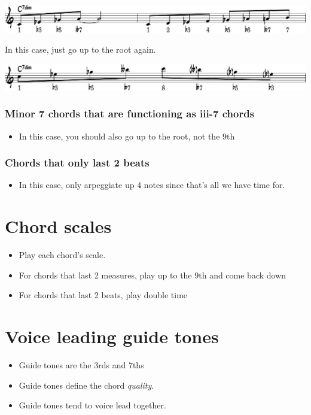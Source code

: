 \documentclass[11pt]{article}
\begin{document}
\begin{center}
\includegraphics[width=0.98\linewidth]{diminished-scale-and-arpeg.pdf}
\end{center}

In this case, just go up to the root again.

\begin{center}
\includegraphics[width=0.98\linewidth]{arpeg-9th-dim.pdf}
\end{center}

\subsubsection{Minor 7 chords that are functioning as iii-7 chords}
\label{sec:orge7612ca}
\begin{itemize}
\item In this case, you should also go up to the root, not the 9th
\end{itemize}
\subsubsection{Chords that only last 2 beats}
\label{sec:orgc69031a}
\begin{itemize}
\item In this case, only arpeggiate up 4 notes since that's all we have time for.
\end{itemize}
\section{Chord scales}
\label{sec:orgd3ad68b}
\begin{itemize}
\item Play each chord's scale.
\item For chords that last 2 measures, play up to the 9th and come back down
\item For chords that last 2 beats, play double time
\end{itemize}
\section{Voice leading guide tones}
\label{sec:org4dbaeca}
\begin{itemize}
\item Guide tones are the 3rds and 7ths
\item Guide tones define the chord \emph{quality}.
\item Guide tones tend to voice lead together.
\end{itemize}
\end{document}
